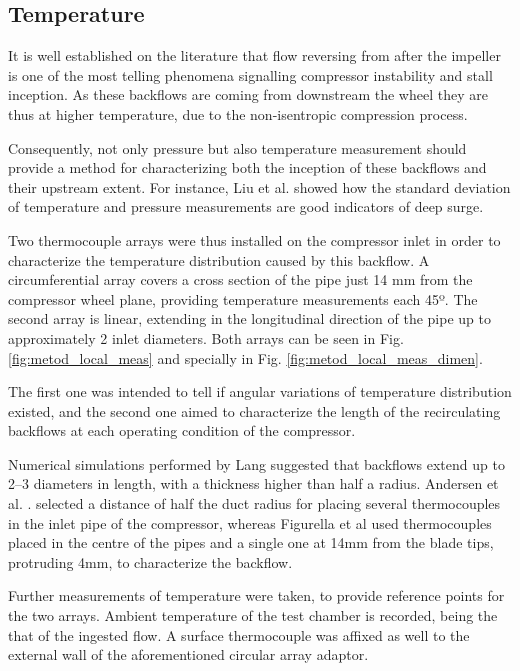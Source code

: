 \subsection{Temperature}

It is well established on the literature \cite{koff1986axisymmetrically,galindo2008experiments} that flow reversing from after the impeller is one of the most telling phenomena signalling compressor instability and stall inception. As these backflows are coming from downstream the wheel they are thus at higher temperature, due to the non-isentropic compression process. 

Consequently, not only pressure but also temperature measurement should provide a method for characterizing both the inception of these backflows and their upstream extent. For instance, Liu et al. \cite{liu2013methods} showed how the standard deviation of temperature and pressure measurements are good indicators of deep surge.

Two thermocouple arrays were thus installed on the compressor inlet in order to characterize the temperature distribution caused by this backflow. A circumferential array covers a cross section of the pipe just 14 mm from the compressor wheel plane, providing temperature measurements each 45º. The second array is linear, extending in the longitudinal direction of the pipe up to approximately 2 inlet diameters. Both arrays can be seen in Fig. \ref{fig:metod_local_meas} and specially in Fig. \ref{fig:metod_local_meas_dimen}.

The first one was intended to tell if angular variations of temperature distribution existed, and the second one aimed to characterize the length of the recirculating backflows at each operating condition of the compressor.

Numerical simulations performed by Lang \cite{lang2011contribucion} suggested that backflows extend up to 2--3 diameters in length, with a thickness higher than half a radius. Andersen et al. \cite{andersen2009surge}. selected a distance of half the duct radius for placing several thermocouples in the inlet pipe of the compressor, whereas Figurella et al \cite{figurella2012noise} used thermocouples placed in the centre of the pipes and a single one at 14mm from the blade tips, protruding 4mm, to characterize the backflow.

Further measurements of temperature were taken, to provide reference points for the two arrays. Ambient temperature of the test chamber is recorded, being the that of the ingested flow. A surface thermocouple was affixed as well to the external wall of the aforementioned circular array adaptor.

